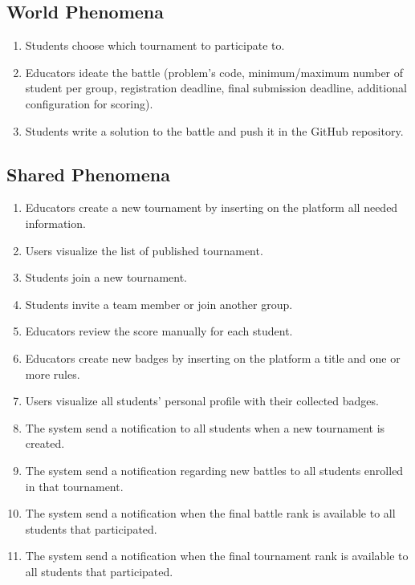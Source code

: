\subsection{World Phenomena}
\begin{enumerate}[label=\textbf{WP.\arabic*}]
	\item Students choose which tournament to participate to.
	\item Educators ideate the battle (problem's code, minimum/maximum number of student per group, registration deadline, final submission deadline, additional configuration for scoring).
        \item Students write a solution to the battle and push it in the GitHub repository.
\end{enumerate}

\subsection{Shared Phenomena}
\begin{enumerate}[label=\textbf{SP.\arabic*}]
        \item Educators create a new tournament by inserting on the platform all needed information.
        \item Users visualize the list of published tournament.
        \item Students join a new tournament.
        \item Students invite a team member or join another group.
	\item Educators review the score manually for each student.
        \item Educators create new badges by inserting on the platform a title and one or more rules.
        \item Users visualize all students' personal profile with their collected badges.
        \item The system send a notification to all students when a new tournament is created.
        \item The system send a notification regarding new battles to all students enrolled in that tournament.
        \item The system send a notification when the final battle rank is available to all students that participated.
        \item The system send a notification when the final tournament rank is available to all students that participated.
\end{enumerate}

